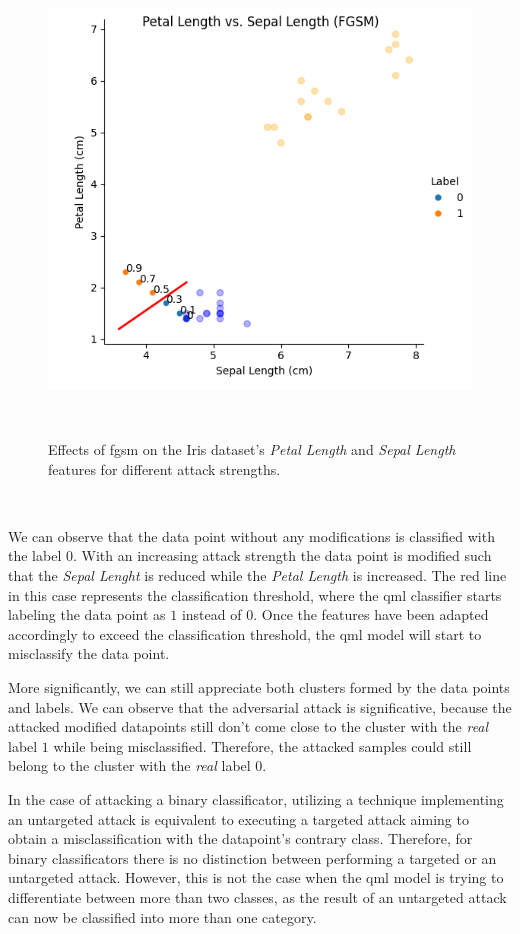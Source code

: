 \begin{figure}[h!]
  \includegraphics[scale=0.75]{figures/tabular-adversarial.png}
  \centering
  \caption{Effects of \ac{fgsm} on the Iris dataset's \textit{Petal Length} and \textit{Sepal Length} features for different attack strengths.}
~\label{fig:adversarial_tabular}
\end{figure} \

We can observe that the data point without any modifications
is classified with the label \(0\). With an increasing attack
strength the data point is modified such that the \textit{Sepal
Lenght} is reduced while the \textit{Petal Length} is increased.
The red line in this case represents the classification threshold,
where the \ac{qml} classifier starts labeling the data point as
\(1\) instead of \(0\). Once the features have been adapted
accordingly to exceed the classification threshold, the \ac{qml}
model will start to misclassify the data point. \

More significantly, we can still appreciate both clusters
formed by the data points and labels. We can observe that
the adversarial attack is significative, because the attacked
modified datapoints still don't come close to the cluster
with the \textit{real} label \(1\) while being misclassified.
Therefore, the attacked samples could still belong to the
cluster with the \textit{real} label \(0\). \

In the case of attacking a binary classificator, utilizing
a technique implementing an untargeted attack is equivalent
to executing a targeted attack aiming to obtain a misclassification
with the datapoint's contrary class. Therefore, for binary
classificators there is no distinction between performing a
targeted or an untargeted attack. However, this is not the case when
the \ac{qml} model is trying to differentiate between more than
two classes, as the result of an untargeted attack can now
be classified into more than one category. \

